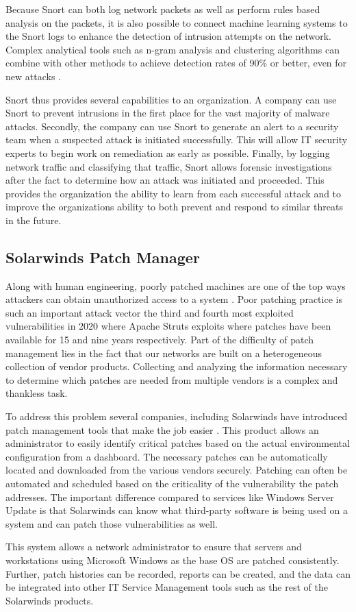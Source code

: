 Because Snort can both log network packets as well as perform rules based analysis on the packets, it is also possible to connect machine learning systems to the Snort logs to enhance the detection of intrusion attempts on the network. Complex analytical tools such as n-gram analysis and clustering algorithms can combine with other methods to achieve detection rates of 90\% or better, even for new attacks \parencite{khammasPrefiltersIntransitMalware2019,arraEvaluationPredictionImplementation2021}.

Snort thus provides several capabilities to an organization. A company can use Snort to prevent intrusions in the first place for the vast majority of malware attacks. Secondly, the company can use Snort to generate an alert to a security team when a suspected attack is initiated successfully. This will allow IT security experts to begin work on remediation as early as possible. Finally, by logging network traffic and classifying that traffic, Snort allows forensic investigations after the fact to determine how an attack was initiated and proceeded. This provides the organization the ability to learn from each successful attack and to improve the organizations ability to both prevent and respond to similar threats in the future.

\subsection{Solarwinds Patch Manager}

Along with human engineering, poorly patched machines are one of the top ways attackers can obtain unauthorized access to a system \parencite{Top10Cybersecurity2021}. Poor patching practice is such an important attack vector the third and fourth most exploited vulnerabilities in 2020 where Apache Struts exploits where patches have been available for 15 and nine years respectively. Part of the difficulty of patch management lies in the fact that our networks are built on a heterogeneous collection of vendor products. Collecting and analyzing the information necessary to determine which patches are needed from multiple vendors is a complex and thankless task.

To address this problem several companies, including Solarwinds have introduced patch management tools that make the job easier \parencite{solarwindsPatchManagementSoftware2021}. This product allows an administrator to easily identify critical patches based on the actual environmental configuration from a dashboard. The necessary patches can be automatically located and downloaded from the various vendors securely. Patching can often be automated and scheduled based on the criticality of the vulnerability the patch addresses. The important difference compared to services like Windows Server Update is that Solarwinds can know what third-party software is being used on a system and can patch those vulnerabilities as well.

This system allows a network administrator to ensure that servers and workstations using Microsoft Windows as the base OS are patched consistently. Further, patch histories can be recorded, reports can be created, and the data can be integrated into other IT Service Management tools such as the rest of the Solarwinds products.
